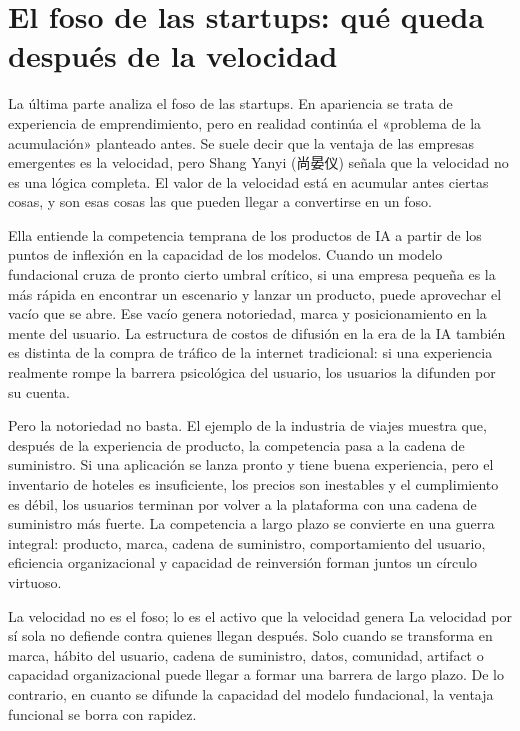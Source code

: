 \section{El foso de las startups: qué queda después de la velocidad}

La última parte analiza el foso de las startups. En apariencia se trata de experiencia de emprendimiento, pero en realidad continúa el «problema de la acumulación» planteado antes. Se suele decir que la ventaja de las empresas emergentes es la velocidad, pero Shang Yanyi (尚晏仪) señala que la velocidad no es una lógica completa. El valor de la velocidad está en acumular antes ciertas cosas, y son esas cosas las que pueden llegar a convertirse en un foso.

Ella entiende la competencia temprana de los productos de IA a partir de los puntos de inflexión en la capacidad de los modelos. Cuando un modelo fundacional cruza de pronto cierto umbral crítico, si una empresa pequeña es la más rápida en encontrar un escenario y lanzar un producto, puede aprovechar el vacío que se abre. Ese vacío genera notoriedad, marca y posicionamiento en la mente del usuario. La estructura de costos de difusión en la era de la IA también es distinta de la compra de tráfico de la internet tradicional: si una experiencia realmente rompe la barrera psicológica del usuario, los usuarios la difunden por su cuenta.

Pero la notoriedad no basta. El ejemplo de la industria de viajes muestra que, después de la experiencia de producto, la competencia pasa a la cadena de suministro. Si una aplicación se lanza pronto y tiene buena experiencia, pero el inventario de hoteles es insuficiente, los precios son inestables y el cumplimiento es débil, los usuarios terminan por volver a la plataforma con una cadena de suministro más fuerte. La competencia a largo plazo se convierte en una guerra integral: producto, marca, cadena de suministro, comportamiento del usuario, eficiencia organizacional y capacidad de reinversión forman juntos un círculo virtuoso.

\begin{importantbox}{La velocidad no es el foso; lo es el activo que la velocidad genera}
La velocidad por sí sola no defiende contra quienes llegan después. Solo cuando se transforma en marca, hábito del usuario, cadena de suministro, datos, comunidad, artifact o capacidad organizacional puede llegar a formar una barrera de largo plazo. De lo contrario, en cuanto se difunde la capacidad del modelo fundacional, la ventaja funcional se borra con rapidez.
\end{importantbox}

